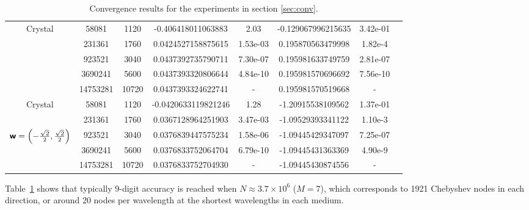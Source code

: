 \documentclass[11pt,final]{amsart}
\theoremstyle{definition}
\numberwithin{remark}{section}
\numberwithin{definition}{section}
\numberwithin{pro}{section}
\begin{document}
\begin{table}[ht]
\begin{tabular}{|c|c|c|c|c|c|c|c|}
\multirow{5}{*}{Crystal}%
		    &58081&1120&-0.406418011063883 &2.03 & -0.129067996215635& 3.42e-01\\
		    &231361&1760&0.0424527158875615&1.53e-03 &0.195870563479998 &1.82e-4\\
		    &923521&3040&0.0437392735790711&7.30e-07	&0.195981633749759& 2.81e-07\\
		    &3690241& 5600&0.0437393320806644&4.84e-10 & 0.195981570696692&  7.56e-10\\
		    &14753281& 10720&0.0437393324622741&- & 0.195981570519668& -\\ \hline
\multirow{2}{*}{Crystal}%
		    &58081&1120&-0.0420633119821246 	 &1.28 & -1.20915538109562	& 1.37e-01\\
&231361&1760&0.0367128964251903	&3.47e-03 &-1.09529393341122	 &1.10e-3\\
\multirow{3}{*}{ $\bm{\mathsf{w}} = \left(-\frac{\sqrt{2}}{2},\frac{\sqrt{2}}{2}\right)$}
&923521&3040&0.0376839447575234	&1.58e-06&-1.09445429347097	& 7.25e-07\\
		    &3690241& 5600&0.0376833752064704	&6.79e-10 &-1.09445431363369 	&  4.90e-9\\
		    &14753281& 10720&0.0376833752704930	&- &-1.09445430874556	& -\\ \hline
 \end{tabular}
\vspace{1ex}
\caption{\label{tab:vary} Convergence results for the experiments in section \ref{sec:conv}.}
\end{table}

Table~\ref{tab:vary} shows that typically 9-digit accuracy is reached
when $N \approx 3.7\times 10^6$ ($M=7$),
which corresponds to 1921 Chebyshev nodes in each direction,
or around 20 nodes per wavelength at the shortest wavelengths in each medium.
\end{document}
